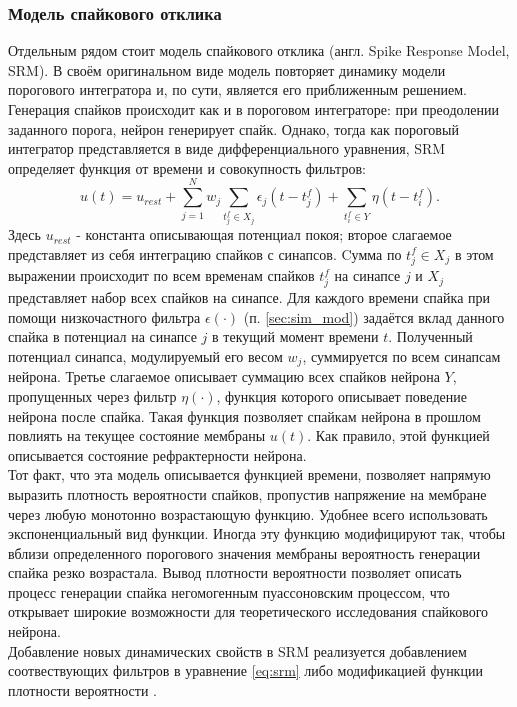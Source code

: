 \documentclass[a4paper,10pt]{article}
\begin{document}
\subsubsection{Модель спайкового отклика}\label{sec:srm}
\indent Отдельным рядом стоит модель спайкового отклика (англ. Spike Response Model, SRM). В своём оригинальном виде модель повторяет динамику модели порогового интегратора и, по сути, является его приближенным решением.\\ 
\indent Генерация спайков происходит как и в пороговом интеграторе: при преодолении заданного порога, нейрон генерирует спайк. Однако, тогда как пороговый интегратор представляется в виде дифференциального уравнения, SRM определяет функция от времени и совокупность фильтров:
\begin{equation}\label{eq:srm}
u(t) = u_{rest} + \sum_{j=1}^N w_{j} \sum_{t^{f}_{j} \in X_{j}} \epsilon_{j}(t-t^{f}_{j}) + \sum_{t^{f}_{i}\in Y}\eta(t-t^{f}_{i}).
\end{equation}
Здесь $u_{rest}$ - константа описывающая потенциал покоя; второе слагаемое представляет из себя интеграцию спайков с синапсов. Cумма по $t^{f}_{j} \in X_{j}$ в этом выражении происходит по всем временам спайков $t^{f}_{j}$ на синапсе $j$ и $X_{j}$ представляет набор всех спайков на синапсе. Для каждого времени спайка при помощи низкочастного фильтра $\epsilon(\cdot)$ (п. \ref{sec:sim_mod}) задаётся вклад данного спайка в потенциал на синапсе $j$ в текущий момент времени $t$. Полученный потенциал синапса, модулируемый его весом $w_{j}$, суммируется по всем синапсам нейрона. Третье слагаемое описывает суммацию всех спайков нейрона $Y$, пропущенных через фильтр $\eta(\cdot)$, функция которого описывает поведение нейрона после спайка. Такая функция позволяет спайкам нейрона в прошлом повлиять на текущее состояние мембраны $u(t)$. Как правило, этой функцией описывается состояние рефрактерности нейрона.\\
\indent Тот факт, что эта модель описывается функцией времени, позволяет напрямую выразить плотность вероятности спайков, пропустив напряжение на мембране через любую монотонно возрастающую функцию. Удобнее всего использовать экспоненциальный вид функции. Иногда эту функцию модифицируют так, чтобы вблизи определенного порогового значения мембраны вероятность генерации спайка резко возрастала. Вывод плотности вероятности позволяет описать процесс генерации спайка негомогенным пуассоновским процессом, что открывает широкие возможности для теоретического исследования спайкового нейрона.\\
\indent Добавление новых динамических свойств в SRM реализуется добавлением соотвествующих фильтров в уравнение \eqref{eq:srm} либо модификацией функции плотности вероятности \cite{TripleAdapt,AdaptThesis}. 
\end{document}

